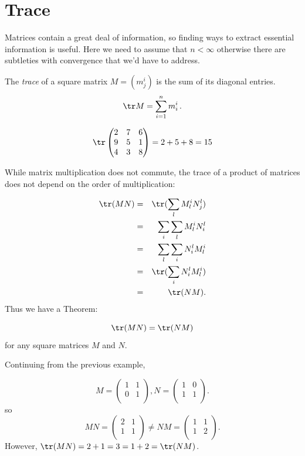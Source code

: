 \section{Trace}

Matrices contain a great deal of information, so finding ways to extract essential information is useful. Here we need to assume that $n < \infty$ otherwise there are subtleties with convergence that we'd have to address.

\begin{definition}
The \emph{trace} of a square matrix $M=(m_j^i)$ is the sum of its diagonal entries.
\[
\tr M = \sum_{i=1}^{n}m_i^i\, .
\]
\end{definition}

\begin{example}
\[
\tr \begin{pmatrix}
2 & 7 & 6\\
9 & 5 & 1\\
4 & 3 & 8\\
\end{pmatrix} = 2+5+8 = 15
\]
\end{example}
While matrix multiplication does not commute, the trace of a product of matrices does not depend on the order of multiplication:

\begin{eqnarray*}
\tr(MN) & = & \tr( \sum_l M_l^i N_j^l ) \\
& = & \sum_i \sum_l M_l^i N_i^l \\
& = & \sum_l \sum_i N_i^l M_l^i \\
& = & \tr( \sum_i N_i^l M_l^i ) \\
& = & \tr( NM ).
\end{eqnarray*}
Thus we have a Theorem:
\begin{theorem} \[\tr(MN)=\tr(NM)\] for any square matrices $M$ and $N$.
\end{theorem}

\begin{example}
Continuing from the previous example, 

\[
M= \begin{pmatrix}
1 & 1 \\
0 & 1 \\
\end{pmatrix}, N=
\begin{pmatrix}
1 & 0 \\
1 & 1 \\
\end{pmatrix}.
\]
so
\[
MN = \begin{pmatrix}
2 & 1 \\
1 & 1 \\
\end{pmatrix} \neq
NM = \begin{pmatrix}
1 & 1 \\
1 & 2 \\
\end{pmatrix}.
\]
However, $\tr(MN) = 2+1 = 3 = 1+2 = \tr(NM)$.
\end{example}

